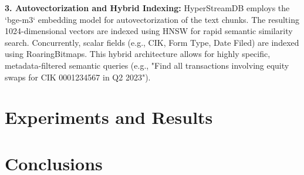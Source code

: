 \documentclass[journal, onecolumn]{IEEEtran}
\begin{document}
\textbf{3. Autovectorization and Hybrid Indexing:}
HyperStreamDB employs the `bge-m3` embedding model for autovectorization of the text chunks. The resulting 1024-dimensional vectors are indexed using HNSW for rapid semantic similarity search. Concurrently, scalar fields (e.g., CIK, Form Type, Date Filed) are indexed using RoaringBitmaps. This hybrid architecture allows for highly specific, metadata-filtered semantic queries (e.g., "Find all transactions involving equity swaps for CIK 0001234567 in Q2 2023").

\section{Experiments and Results}

\section{Conclusions}



\end{document}
